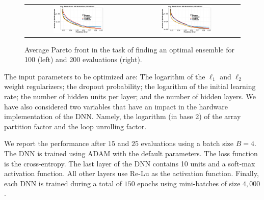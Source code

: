 \begin{figure}[ht]
\begin{center}
\begin{tabular}{cc}
\includegraphics[width=0.49\textwidth]{Figures/ppesmoc/plot_100_ensemble.pdf} & \includegraphics[width=0.49\textwidth]{Figures/ppesmoc/plot_200_ensemble.pdf} \\
\end{tabular}
\caption{Average Pareto front in the task of finding an optimal ensemble for 100 (left) and 200 evaluations (right).
}
\label{fig:ensemble}
\end{center}
\end{figure}

The input parameters to be optimized are:
The logarithm of the $\ell_1$  and $\ell_2$ weight regularizers;
the dropout probability; the logarithm of the initial learning
rate; the number of hidden units per layer; and the number of hidden layers. We have 
also considered two variables that have an impact in the hardware implementation
of the DNN. Namely, the logarithm (in base 2) of the array partition 
factor and the loop unrolling factor.
 
We report the performance after $15$ and $25$ evaluations using a batch 
size $B=4$. The DNN is trained  using ADAM with the default parameters. 
The loss function is the  cross-entropy. The last layer of 
the DNN contains 10 units and a soft-max activation function. All other layers use
Re-Lu as the activation function. Finally, each DNN is trained during a total of
$150$ epochs using mini-batches of size $4,000$.

